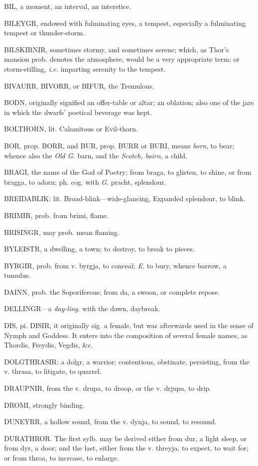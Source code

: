 BIL, a moment, an interval, an interstice.

BILEYGR, endowed with fulminating eyes, a tempest, especially a
fulminating tempest or thunder-storm.

BILSKIRNIR, sometimes stormy, and sometimes serene; which, as Thor's
mansion prob. denotes the atmosphere, would be a very appropriate
term; or storm-stilling, \emph{i.e.} imparting serenity to the tempest.

BIVAURR, BIVORR, or BIFUR, the Tremulous.

BODN, originally signified an offer-table or altar; an oblation; also
one of the jars in which the dwarfs' poetical beverage was kept.

BOLTHORN, lit. Calamitous or Evil-thorn.

BOR, prop. BORR, and BUR, prop. BURR or BURI, means \emph{born}, to bear;
whence also the \emph{Old G.} barn, and the \emph{Scotch, bairn}, a child.

BRAGI, the name of the God of Poetry; from braga, to glisten, to
shine, or from bragga, to adorn; ph. cog. with \emph{G}. pracht, splendour.

BREIDABLIK: lit. Broad-blink—wide-glancing, Expanded splendour, to
blink.

BRIMIR, prob. from brimi, flame.

BRISINGR, may prob. mean flaming.

BYLEISTR, a dwelling, a town; to destroy, to break to pieces.

BYRGIR, prob. from v. byrgja, to conceal; \emph{E.} to bury, whence barrow,
a tumulus.

DAINN, prob. the Soporiferous; from da, a swoon, or complete repose.

DELLINGR—a \emph{day-ling}. with the dawn, daybreak.

DIS, pi. DISIR, it originally sig. a female, but was afterwards used
in the sense of Nymph and Goddess. It enters into the composition of
several female names, as Thordis, Freydis, Vegdis, \&c.

DOLGTHRASIR: a dolgr, a warrior; contentious, obstinate, persisting,
from the v. thrasa, to litigate, to quarrel.

DRAUPNIR, from the v. drupa, to droop, or the v. drjupa, to drip.

DROMI, strongly binding.

DUNEYRR, a hollow sound, from the v. dynja, to sound, to resound.

DURATHROR. The first sylb. may be derived either from dur, a light
sleep, or from dyr, a door; and the last, either from the v. threyja,
to expect, to wait for; or from throa, to increase, to enlarge.

